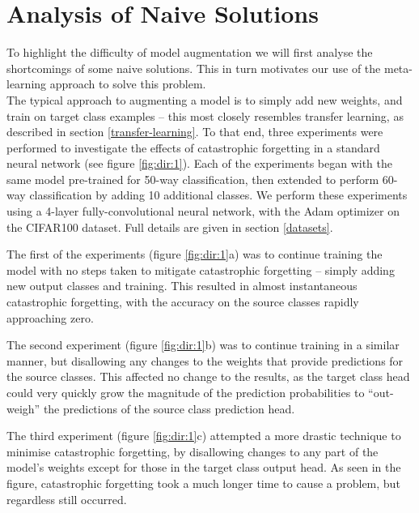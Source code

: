 \documentclass{report}
\begin{document}
\section{Analysis of Naive Solutions} \label{naiveanalysis}
To highlight the difficulty of model augmentation we will first analyse the shortcomings of some naive solutions. This in turn motivates our use of the meta-learning approach to solve this problem. \\
The typical approach to augmenting a model is to simply add new weights, and train on target class examples -- this most closely resembles transfer learning, as described in section \ref{transfer-learning}. To that end, three experiments were performed to investigate the effects of catastrophic forgetting in a standard neural network (see figure \ref{fig:dir:1}). Each of the experiments began with the same model pre-trained for 50-way classification, then extended to perform 60-way classification by adding 10 additional classes. We perform these experiments using a 4-layer fully-convolutional neural network, with the Adam optimizer on the CIFAR100 dataset. Full details are given in section \ref{datasets}. \par
The first of the experiments (figure \ref{fig:dir:1}a) was to continue training the model with no steps taken to mitigate catastrophic forgetting -- simply adding new output classes and training. This resulted in almost instantaneous catastrophic forgetting, with the accuracy on the source classes rapidly approaching zero. \par
The second experiment (figure \ref{fig:dir:1}b) was to continue training in a similar manner, but disallowing any changes to the weights that provide predictions for the source classes. This affected no change to the results, as the target class head could very quickly grow the magnitude of the prediction probabilities to ``out-weigh'' the predictions of the source class prediction head. \par
The third experiment (figure \ref{fig:dir:1}c) attempted a more drastic technique to minimise catastrophic forgetting, by disallowing changes to any part of the model's weights except for those in the target class output head. As seen in the figure, catastrophic forgetting took a much longer time to cause a problem, but regardless still occurred. \par
\end{document}

